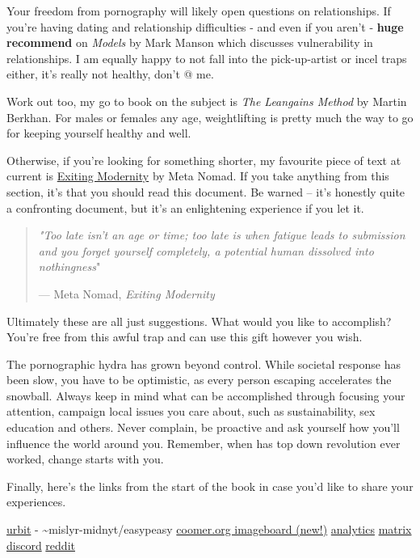 \documentclass[
]{book}
\begin{document}
Your freedom from pornography will likely open questions on relationships. If you're having dating and relationship difficulties - and even if you aren't - \textbf{huge recommend} on \emph{Models} by Mark Manson which discusses vulnerability in relationships. I am equally happy to not fall into the pick-up-artist or incel traps either, it's really not healthy, don't @ me.

Work out too, my go to book on the subject is \emph{The Leangains Method} by Martin Berkhan. For males or females any age, weightlifting is pretty much the way to go for keeping yourself healthy and well.

Otherwise, if you're looking for something shorter, my favourite piece of text at current is \href{https://www.meta-nomad.net/exiting-modernity/}{Exiting Modernity} by Meta Nomad. If you take anything from this section, it's that you should read this document. Be warned -- it's honestly quite a confronting document, but it's an enlightening experience if you let it.

\begin{quote}
\emph{"Too late isn't an age or time; too late is when fatigue leads to submission and you forget yourself completely, a potential human dissolved into nothingness}"

--- Meta Nomad, \emph{Exiting Modernity}
\end{quote}

Ultimately these are all just suggestions. What would you like to accomplish? You're free from this awful trap and can use this gift however you wish.

The pornographic hydra has grown beyond control. While societal response has been slow, you have to be optimistic, as every person escaping accelerates the snowball. Always keep in mind what can be accomplished through focusing your attention, campaign local issues you care about, such as sustainability, sex education and others. Never complain, be proactive and ask yourself how you'll influence the world around you. Remember, when has top down revolution ever worked, change starts with you.

Finally, here's the links from the start of the book in case you'd like to share your experiences.

\href{https://urbit.org}{urbit} - \textasciitilde mislyr-midnyt/easypeasy \textbar{} \href{https://coomer.org}{coomer.org imageboard (new!)} \textbar{} \href{https://plausible.io/easypeasymethod.org}{analytics} \textbar{} \href{https://matrix.to/\#/!xmJZznbJXuwzEGSEti:matrix.org?via=matrix.org}{matrix} \textbar{} \href{https://discord.com/invite/bCXEnf9}{discord} \textbar{} \href{https://reddit.com/r/pmohackbook}{reddit}
\end{document}
